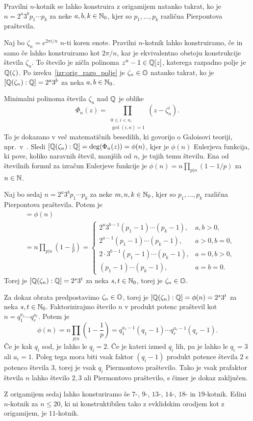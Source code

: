 \begin{izrek}
    Pravilni $n$-kotnik se lahko konstruira z origamijem natanko takrat, ko je $n = 2^a 3^b p_1 \cdots p_k$ za neke $a,b,k \in \mathbb N_0$, kjer so $p_1, \ldots, p_k$ različna Pierpontova praštevila.
\end{izrek}
\begin{dokaz}
    Naj bo $\zeta_n = e^{2 \pi i / n}$ $n$-ti koren enote. Pravilni $n$-kotnik lahko konstruiramo, če in samo če lahko konstruiramo kot $2 \pi / n$, kar je ekvivalentno obstoju konstrukcije števila $\zeta_n$. To število je ničla polinoma $z^n - 1 \in \mathbb Q[z]$, katerega razpadno polje je $\mathbb Q(\zeta)$. Po izreku~\ref{izr:orig_razp_polje} je $\zeta_n \in \mathbb O$ natanko takrat, ko je $[\mathbb Q(\zeta_n) : \mathbb Q] = 2^a3^b$ za neka $a, b \in \mathbb N_0$.

    Minimalni polinoma števila $\zeta_n$ nad $\mathbb Q$ je oblike
    $$ \Phi_n(z) = \prod_{\substack{0 \leq i < n, \\ \gcd(i,n)=1}} (z - \zeta_n^i). $$
    To je dokazano v več matematičnih besedilih, ki govorijo o Galoisovi teoriji, npr.\ v~\cite[poglavje $9.1$]{cox2005}.
    Sledi $[\mathbb Q(\zeta_n) : \mathbb Q] = \deg(\Phi_n(z)) = \phi(n)$, kjer je $\phi(n)$ Eulerjeva funkcija, ki pove, koliko naravnih števil, manjših od $n$, je tujih temu številu. Ena od številnih formul za izračun Eulerjeve funkcije je $\phi(n) = n \prod_{p|n} (1 - 1/p)$ za $n \in \mathbb N$.

    Naj bo sedaj $n = 2^a 3^b p_1 \cdots p_k$ za neke $m,n,k \in \mathbb N_0$, kjer so $p_1, \ldots, p_k$ različna Pierpontova praštevila. Potem je
    \begin{align*}
        [\Q(\zeta_n) : \Q] &= \phi(n) \\
        &= n \prod_{p|n} (1 - \frac{1}{p}) =
        \begin{cases}
            2^a3^{b-1}(p_1 -1) \cdots (p_k -1), &a,b>0,\\
            2^{a-1}(p_1 -1) \cdots (p_k -1), &a>0, b=0,\\
            2 \cdot 3^{b-1}(p_1 -1) \cdots (p_k -1), &a=0,b>0,\\
            (p_1 -1) \cdots (p_k -1), &a=b=0.
            \end{cases}
    \end{align*}
    Torej je $[\mathbb Q(\zeta_n) : \mathbb Q] = 2^s3^t$ za neka $s,t \in \mathbb N_0$, torej je $\zeta_n \in \mathbb O$.

    Za dokaz obrata predpostavimo $\zeta_n \in \mathbb O$, torej je $[\mathbb Q(\zeta_n) : \mathbb Q] = \phi(n) = 2^s3^t$ za neka $s,t \in \mathbb N_0$. Faktorizirajmo število $n$ v produkt potenc praštevil kot $n = q_1^{a_1} \cdots q_r^{a_r}$. Potem je
    $$ \phi(n) = n \prod_{p|n} (1 - \frac{1}{p}) = q_1^{a_1-1} (q_1 -1) \cdots q_r^{a_r-1} (q_r -1).$$
    Če je kak $q_i$ sod, je lahko le $q_i = 2$. Če je kateri izmed $q_i$ lih, pa je lahko le $q_i = 3$ ali $a_i = 1$. Poleg tega mora biti vsak faktor $(q_i - 1)$ produkt potence števila $2$ s potenco števila $3$, torej je vsak $q_i$ Piermontovo praštevilo. Tako je vsak prafaktor števila $n$ lahko število $2, 3$ ali Piermontovo praštevilo, s čimer je dokaz zaključen.
\end{dokaz}

Z origamijem sedaj lahko konsturiramo še $7$-, $9$-, $13$-, $14$-, $18$- in $19$-kotnik. Edini $n$-kotnik za $n \leq 20$, ki ni konstruktibilen tako z evklidskim orodjem kot z origamijem, je $11$-kotnik.